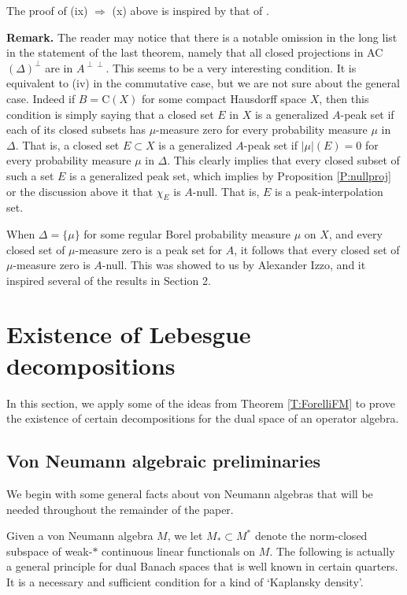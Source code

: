 \documentclass[10pt]{amsart}
\newcommand{\rC}{\mathrm{C}}
\theoremstyle{definition}
\begin{document}
The proof of (ix) $\Rightarrow$ (x) above is inspired by that of \cite[Theorem 9.5.6]{rudin2008}.   

\medskip

{\bf Remark.} The reader may notice that there is a notable omission in the long list in the statement of the last theorem, namely that all closed projections in AC$(\Delta)^\perp$ are in $A^{\perp \perp}$.  This seems to be a very interesting condition.    It is equivalent to (iv) in the commutative case, but we are not sure about the general case.  
Indeed if $B = \rC(X)$ for some compact Hausdorff space $X$,
then 
this condition is simply saying that a closed set  $E$ in $X$ is a generalized $A$-peak set if each of its closed subsets has $\mu$-measure zero  for every probability measure $\mu$ in $\Delta$.  
That is, a closed set  $E\subset X$ is a generalized $A$-peak set if  
$| \mu | (E) = 0$ 
for every probability measure $\mu$ in $\Delta$.  This clearly implies that 
every closed subset of such a set $E$ is a generalized peak set, which implies by Proposition \ref{P:nullproj} or the discussion above it that $\chi_E$ is $A$-null. 
 That is,
$E$ is a peak-interpolation set. 


When $\Delta = \{ \mu \}$ for some regular Borel probability measure $\mu$ on $X$,  and every closed set of $\mu$-measure zero is a peak set for $A$,  it follows that every closed set of $\mu$-measure zero is $A$-null.  This was showed to us by Alexander Izzo, and it inspired several of the results in Section 2.   

 

\section{Existence of Lebesgue decompositions}\label{S:Leb}

In this section, we apply some of the ideas from Theorem \ref{T:ForelliFM} to prove the existence of certain decompositions for the dual space of an operator algebra.

\subsection{Von Neumann algebraic preliminaries}
We begin with some general facts about von Neumann algebras that will be needed throughout the remainder of the paper.

Given a von Neumann algebra $M$, we let $M_*\subset M^*$ denote the norm-closed subspace of weak-$*$ continuous linear functionals on $M$.  The following is actually a general principle for dual Banach spaces
that is well known in certain quarters.   It is a necessary and sufficient condition for a kind of `Kaplansky density'. 
\end{document}
